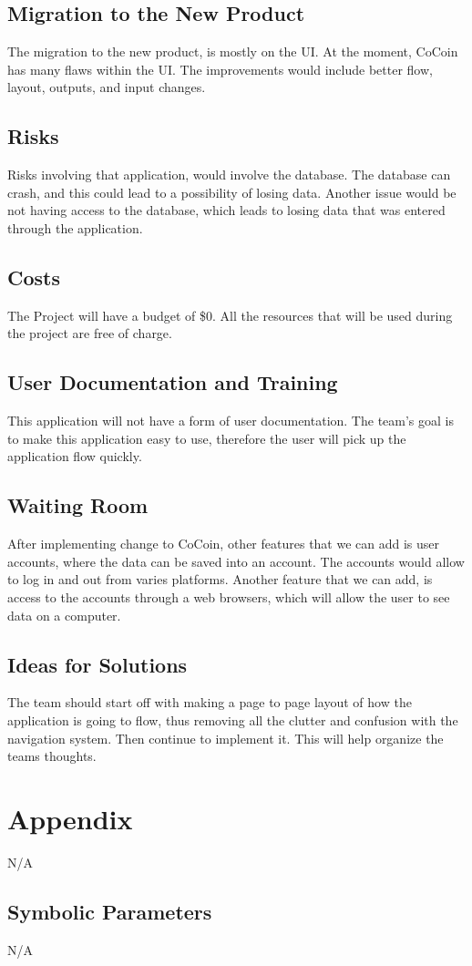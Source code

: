\documentclass[12pt, titlepage]{article}
\begin{document}
\subsection{Migration to the New Product}
The migration to the new product, is mostly on the UI. At the moment, CoCoin has many flaws within the UI. The improvements would include better flow, layout, outputs, and input changes. 
\subsection{Risks}
Risks involving that application, would involve the database. The database can crash, and this could lead to a possibility of losing data. Another issue would be not having access to the database, which leads to losing data that was entered through the application.
\subsection{Costs}
The Project will have a budget of \$0. All the resources that will be used during the project are free of charge. 
\subsection{User Documentation and Training}
This application will not have a form of user documentation. The team’s goal is to make this application easy to use, therefore the user will pick up the application flow quickly. 
\subsection{Waiting Room}
After implementing change to CoCoin, other features that we can add is user accounts, where the data can be saved into an account. The accounts would allow to log in and out from varies platforms. Another feature that we can add, is access to the accounts through a web browsers, which will allow the user to see data on a computer. 
\subsection{Ideas for Solutions}
The team should start off with making a page to page layout of how the application is going to flow, thus removing all the clutter and confusion with the navigation system. Then continue to implement it. This will help organize the teams thoughts.




\newpage

\section{Appendix}
N/A

\subsection{Symbolic Parameters}
N/A
\end{document}
